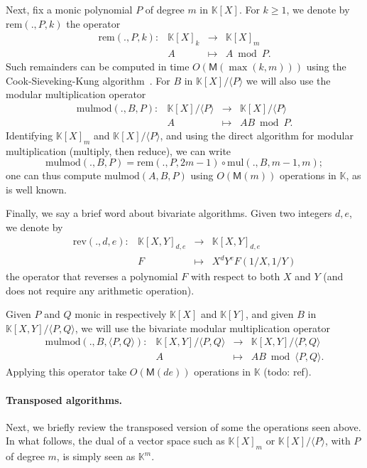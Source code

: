 \documentclass[12pt]{article}
\def\M {\ensuremath{\mathsf{M}}}
\def\K {\ensuremath{\mathbb{K}}}
\def\mul {\ensuremath{\mathrm{mul}}}
\def\rem {\ensuremath{\mathrm{rem}}}
\def\mulmod {\ensuremath{\mathrm{mulmod}}}
\def\rev {\ensuremath{\mathrm{rev}}}
\begin{document}
Next, fix a monic polynomial $P$ of degree $m$ in $\K[X]$. For $k \ge 1$, we denote by
$\rem(.,P,k)$ the operator
$$
\begin{array}{cccc}
\rem(.,P,k): &\K[X]_k& \to &\K[X]_{m}\\
& A & \mapsto & A \bmod P.
\end{array}$$ 
Such remainders can be computed in time $O(\M(\max(k,m)))$ using the
Cook-Sieveking-Kung algorithm~\cite[Chapter~9]{vzGG}. For $B$
in $\K[X]/\langle P \rangle$ we will also use the modular multiplication
operator
$$\begin{array}{cccc} \mulmod(.,B,P): & \K[X]/\langle P \rangle & \to
  & \K[X]/\langle P \rangle\\ & A & \mapsto & AB \bmod P.
\end{array}$$ 
Identifying $\K[X]_m$ and $\K[X]/\langle P \rangle$, and using the
direct algorithm for modular multiplication (multiply, then reduce),
we can write $$\mulmod(.,B,P) = \rem(.,P,2m-1) \circ \mul(.,B,m-1,m);$$
one can thus compute $\mulmod(A,B,P)$ using $O(\M(m))$ operations in
$\K$, as is well known.

Finally, we say a brief word about bivariate algorithms.  Given two
integers $d,e$, we denote by
$$
\begin{array}{cccc}
\rev(.,d,e): &\K[X,Y]_{d,e} &\to& \K[X,Y]_{d,e}  \\
& F & \mapsto & X^d Y^e F(1/X,1/Y)
\end{array}$$
the operator that reverses a polynomial $F$ with respect to both $X$
and $Y$ (and does not require any arithmetic operation).

Given $P$ and $Q$ monic in respectively $\K[X]$ and $\K[Y]$, 
and given $B$ in $\K[X,Y]/\langle P,Q\rangle$, we will use the
bivariate modular multiplication operator
$$\begin{array}{cccc} \mulmod(.,B,\langle P,Q \rangle): & \K[X,Y]/\langle P,Q \rangle & \to
  & \K[X,Y]/\langle P,Q \rangle\\ & A & \mapsto & AB \bmod \langle P, Q \rangle.
\end{array}$$ 
Applying this operator take $O(\M(de))$ operations in $\K$ (todo: ref).


\paragraph{Transposed algorithms.}
Next, we briefly review the transposed version of some the operations
seen above. In what follows, the dual of a vector space such as
$\K[X]_m$ or $\K[X]/\langle P \rangle$, with $P$ of degree $m$, is
simply seen as $\K^m$.
\end{document}
